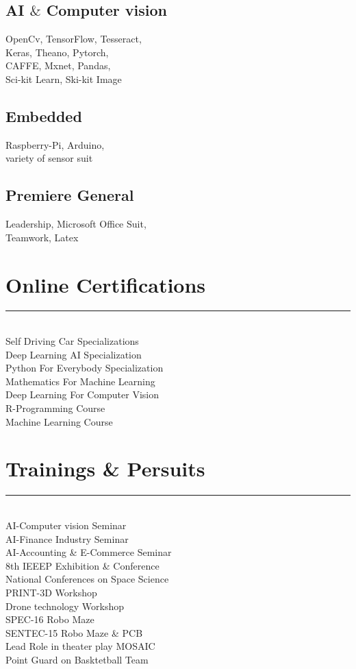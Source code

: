 \documentclass[]{ShumailaAhmed-Resume}
\begin{document}
\begin{minipage}[t]{0.33\textwidth}
\subsection{AI $\&$ Computer vision}
OpenCv, TensorFlow, Tesseract,\\
Keras, Theano, Pytorch,\\
CAFFE, Mxnet, Pandas,\\
Sci-kit Learn, Ski-kit Image
\vspace{6pt}
\subsection{Embedded}
Raspberry-Pi, Arduino, \\
variety of sensor suit
\vspace{6pt}
\subsection{Premiere General}
Leadership, Microsoft Office Suit,\\
Teamwork, Latex
\sectionsep
\section{Online Certifications}
\noindent\rule{5cm}{0.4pt}\\
Self Driving Car Specializations \\
Deep Learning AI Specialization\\
Python For Everybody Specialization\\
Mathematics For Machine Learning\\
Deep Learning For Computer Vision\\
R-Programming Course\\
Machine Learning Course\\
\sectionsep
\section{Trainings \& Persuits } 
\noindent\rule{5cm}{0.4pt}\\
AI-Computer vision Seminar\\
AI-Finance Industry Seminar\\
AI-Accounting & E-Commerce Seminar\\
8th IEEEP Exhibition \& Conference\\
National Conferences on Space Science\\
PRINT-3D Workshop\\
Drone technology Workshop\\
SPEC-16 Robo Maze \\
SENTEC-15 Robo Maze & PCB \\
Lead Role in theater play MOSAIC\\
Point Guard on Basktetball Team
\sectionsep
%
%

\end{minipage} 
\end{document}
